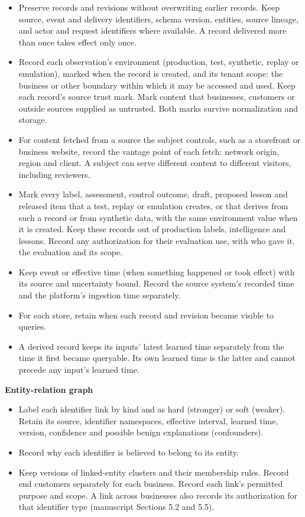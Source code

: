 \documentclass[
  11pt,
]{article}
\providecommand{\tightlist}{%
  \setlength{\itemsep}{0pt}\setlength{\parskip}{0pt}}
\renewcommand{\tightlist}{\setlength{\itemsep}{0pt plus 1pt}\setlength{\parskip}{0pt}}
\begin{document}
\begin{itemize}
\tightlist
\item
  Preserve records and revisions without overwriting earlier records.
  Keep source, event and delivery identifiers, schema version, entities,
  source lineage, and actor and request identifiers where available. A
  record delivered more than once takes effect only once.
\item
  Record each observation's environment (production, test, synthetic,
  replay or emulation), marked when the record is created, and its
  tenant scope: the business or other boundary within which it may be
  accessed and used. Keep each record's source trust mark. Mark content
  that businesses, customers or outside sources supplied as untrusted.
  Both marks survive normalization and storage.
\item
  For content fetched from a source the subject controls, such as a
  storefront or business website, record the vantage point of each
  fetch: network origin, region and client. A subject can serve
  different content to different visitors, including reviewers.
\item
  Mark every label, assessment, control outcome, draft, proposed lesson
  and released item that a test, replay or emulation creates, or that
  derives from such a record or from synthetic data, with the same
  environment value when it is created. Keep these records out of
  production labels, intelligence and lessons. Record any authorization
  for their evaluation use, with who gave it, the evaluation and its
  scope.
\item
  Keep event or effective time (when something happened or took effect)
  with its source and uncertainty bound. Record the source system's
  recorded time and the platform's ingestion time separately.
\item
  For each store, retain when each record and revision became visible to
  queries.
\item
  A derived record keeps its inputs' latest learned time separately from
  the time it first became queryable. Its own learned time is the latter
  and cannot precede any input's learned time.
\end{itemize}


\textbf{Entity-relation graph}

\begin{itemize}
\tightlist
\item
  Label each identifier link by kind and as hard (stronger) or soft
  (weaker). Retain its source, identifier namespaces, effective
  interval, learned time, version, confidence and possible benign
  explanations (confounders).
\item
  Record why each identifier is believed to belong to its entity.
\item
  Keep versions of linked-entity clusters and their membership rules.
  Record end customers separately for each business. Record each link's
  permitted purpose and scope. A link across businesses also records its
  authorization for that identifier type (manuscript Sections 5.2 and
  5.5).
\end{itemize}
\end{document}
